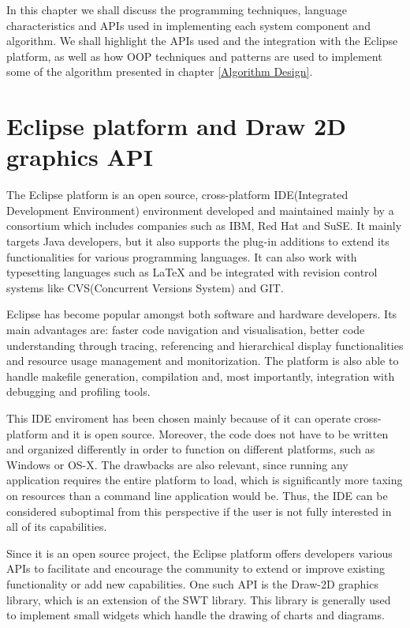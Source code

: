 
In this chapter we shall discuss the programming techniques, language characteristics and APIs
used in implementing each system component and algorithm. We shall highlight the APIs used and the 
integration with the Eclipse platform, as well as how OOP techniques and patterns are used to implement 
some of the algorithm presented in chapter \ref{Algorithm Design}.

\section{Eclipse platform and Draw 2D graphics API}

The Eclipse platform is an open source, cross-platform IDE(Integrated Development Environment) environment 
developed and maintained mainly by a consortium which includes companies such as IBM, Red Hat and SuSE. 
It mainly targets Java developers, but it also supports the plug-in additions to extend its functionalities 
for various programming languages. It can also work with typesetting languages such as LaTeX and be integrated 
with revision control systems like CVS(Concurrent Versions System) and GIT.

Eclipse has become popular amongst both software and hardware developers. Its main advantages are: faster 
code navigation and visualisation, better code understanding through tracing, referencing and hierarchical 
display functionalities and resource usage management and monitorization. The platform is also able to 
handle makefile generation, compilation and, most importantly, integration with debugging and profiling tools.

This IDE enviroment has been chosen mainly because of it can operate cross-platform and it is open source. 
Moreover, the code does not have to be written and organized differently in order to function on different 
platforms, such as Windows or OS-X. The drawbacks are also relevant, since running any application requires 
the entire platform to load, which is significantly more taxing on resources than a command line application 
would be. Thus, the IDE can be considered suboptimal from this perspective if the user is not fully interested 
in all of its capabilities.

Since it is an open source project, the Eclipse platform offers developers various APIs to facilitate and 
encourage the community to extend or improve existing functionality or add new capabilities. One such 
API is the Draw-2D graphics library, which is an extension of the SWT library. This library is generally used 
to implement small widgets which handle the drawing of charts and diagrams.

